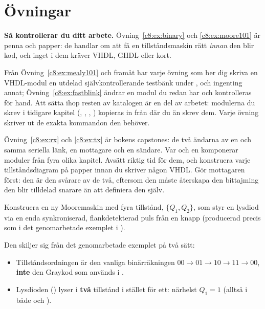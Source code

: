 
\section{Övningar}
\label{c8:sec:exercises}

\begin{aside}
\textbf{Så kontrollerar du ditt arbete.} Övning~\ref{c8:ex:binary} och \ref{c8:ex:moore101} är penna
och papper: de handlar om att få en tillståndsmaskin rätt \emph{innan} den blir kod, och inget i dem
kräver VHDL, GHDL eller kort.

Från Övning~\ref{c8:ex:mealy101} och framåt har varje övning som ber dig skriva en VHDL-modul en
utdelad självkontrollerande testbänk under , och ingenting annat;
Övning~\ref{c8:ex:fastblink} ändrar en modul du redan har och kontrolleras för hand. Att sätta ihop
resten av katalogen är en del av arbetet: modulerna du skrev i tidigare kapitel
(, , , ) kopieras in från där du än skrev
dem. Varje övning skriver ut de exakta kommandon den behöver.

Övning~\ref{c8:ex:rx} och \ref{c8:ex:tx} är bokens capstones: de två ändarna av en och samma
seriella länk, en mottagare och en sändare. Var och en komponerar moduler från fyra olika kapitel.
Avsätt riktig tid för dem, och konstruera varje tillståndsdiagram på papper innan du skriver någon
VHDL. Gör mottagaren först: den är den svårare av de två, eftersom den måste återskapa den
bittajming den blir tilldelad snarare än att definiera den själv.
\end{aside}


\label{c8:ex:binary}
Konstruera en ny Mooremaskin med fyra tillstånd, $\{Q_1, Q_2\}$, som styr en lysdiod via en enda
synkroniserad, flankdetekterad puls  från en knapp (producerad precis som  i det
genomarbetade exemplet i ).

Den skiljer sig från det genomarbetade exemplet på två sätt:
\begin{itemize}
  \item Tillståndsordningen är den vanliga binärräkningen
    $00 \to 01 \to 10 \to 11 \to 00$, \textbf{inte} den Graykod som används i
    .
  \item Lysdioden () lyser i \textbf{två} tillstånd i stället för ett: närhelst $Q_1 = 1$
    (alltså i både  och ).
\end{itemize}

